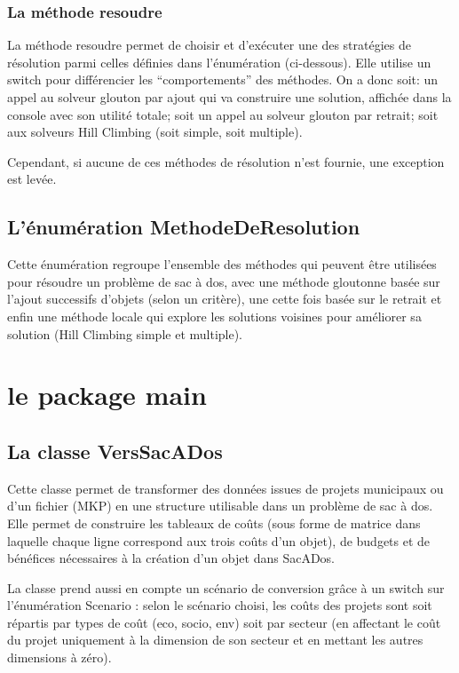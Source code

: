 \documentclass[11pt]{article}
\begin{document}
\subsubsection{La méthode resoudre}
La méthode resoudre permet de choisir et d’exécuter une des stratégies de résolution parmi celles définies dans l’énumération  (ci-dessous). Elle utilise un switch pour différencier les “comportements” des méthodes. On a donc soit: un appel au solveur glouton par ajout qui va construire une solution, affichée dans la console avec son utilité totale; soit un appel au solveur glouton par retrait; soit aux solveurs Hill Climbing (soit simple, soit multiple).

Cependant, si aucune de ces méthodes de résolution n’est fournie, une exception est levée.

\subsection{L’énumération MethodeDeResolution}
Cette énumération regroupe l’ensemble des méthodes qui peuvent être utilisées pour résoudre un problème de sac à dos, avec une méthode gloutonne basée sur l’ajout successifs d’objets (selon un critère), une cette fois basée sur le retrait et enfin une méthode locale qui explore les solutions voisines pour améliorer sa solution (Hill Climbing simple et multiple).


\section{le package main}

\subsection{La classe VersSacADos}
Cette classe permet de transformer des données issues de projets municipaux ou d’un fichier (MKP) en une structure utilisable dans un problème de sac à dos. Elle permet de construire les tableaux de coûts (sous forme de matrice dans laquelle chaque ligne correspond aux trois coûts d’un objet), de budgets et de bénéfices nécessaires à la création d’un objet dans SacADos.

La classe prend aussi en compte un scénario de conversion grâce à un switch sur l’énumération Scenario : selon le scénario choisi, les coûts des projets sont soit répartis par types de coût (eco, socio, env) soit par secteur (en affectant le coût du projet uniquement à la dimension de son secteur et en mettant les autres dimensions à zéro).
\end{document}
